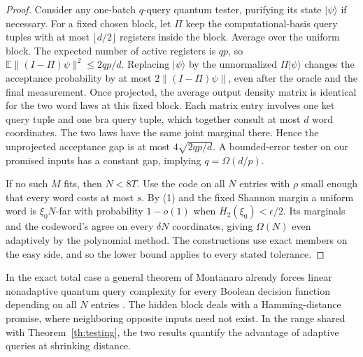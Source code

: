 \begin{proof}
Consider any one-batch $q$-query quantum tester, purifying its state $|\psi\rangle$ if necessary. For a fixed chosen block, let $\Pi$ keep the computational-basis query tuples with at most $\lfloor d/2\rfloor$ registers inside the block. Average over the uniform block. The expected number of active registers is $qp$, so $\mathbb E\|(I-\Pi)\psi\|^2\le2qp/d$. Replacing $|\psi\rangle$ by the unnormalized $\Pi|\psi\rangle$ changes the acceptance probability by at most $2\|(I-\Pi)\psi\|$, even after the oracle and the final measurement. Once projected, the average output density matrix is identical for the two word laws at this fixed block. Each matrix entry involves one ket query tuple and one bra query tuple, which together consult at most $d$ word coordinates. The two laws have the same joint marginal there. Hence the unprojected acceptance gap is at most $4\sqrt{2qp/d}$. A bounded-error tester on our promised inputs has a constant gap, implying $q=\Omega(d/p)$.

If no such $M$ fits, then $N<8T$. Use the code on all $N$ entries with $\rho$ small enough that every word costs at most $s$. By (1) and the fixed Shannon margin a uniform word is $\xi_0 N$-far with probability $1-o(1)$ when $H_2(\xi_0)<\epsilon/2$. Its marginals and the codeword's agree on every $\delta N$ coordinates, giving $\Omega(N)$ even adaptively by the polynomial method. The constructions use exact members on the easy side, and so the lower bound applies to every stated tolerance.
\end{proof}
In the exact total case a general theorem of Montanaro already forces linear nonadaptive quantum query complexity for every Boolean decision function depending on all $N$ entries \cite{mont}. The hidden block deals with a Hamming-distance promise, where neighboring opposite inputs need not exist. In the range shared with Theorem~\ref{th:testing}, the two results quantify the advantage of adaptive queries at shrinking distance.
